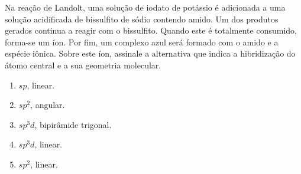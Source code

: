 Na reação de Landolt, uma solução de iodato de potássio é adicionada a uma solução acidificada de bissulfito de sódio contendo amido.
Um dos produtos gerados continua a reagir com o bissulfito.
Quando este é totalmente consumido, forma-se um íon.
Por fim, um complexo azul será formado com o amido e a espécie iônica.
Sobre este íon, assinale a alternativa que indica a hibridização do átomo central e a sua geometria molecular.

\begin{enumerate}[label = (\alph*)]
	\item $sp$, linear.
	\item $sp^2$, angular.
	\item $sp^3d$, bipirâmide trigonal.
	\item $sp^3d$, linear.
	\item $sp^2$, linear.
\end{enumerate}

